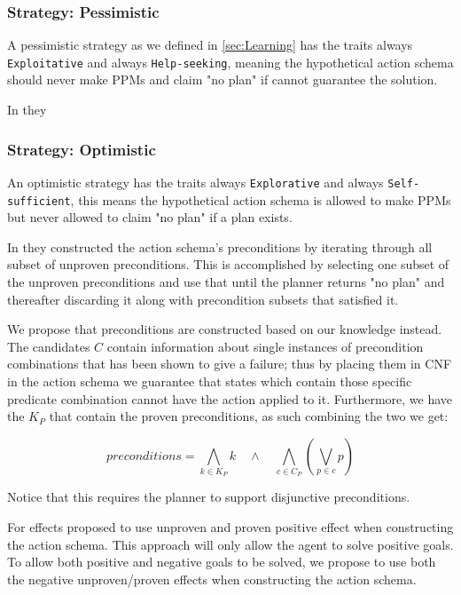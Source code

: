 \documentclass[../Master.tex]{subfiles}
\begin{document}
\subsubsection{Strategy: Pessimistic}

	A pessimistic strategy as we defined in \ref{sec:Learning} has the traits always \texttt{Exploitative} and always \texttt{Help-seeking},
	meaning the hypothetical action schema should never make PPMs and claim "no plan" if cannot guarantee the solution.

	In \cite{Walsh2008} they

\subsubsection{Strategy: Optimistic}

	An optimistic strategy has the traits always \texttt{Explorative} and always \texttt{Self-sufficient},
	this means the hypothetical action schema is allowed to make PPMs but never allowed to claim "no plan" if a plan exists.

	In \cite{Walsh2008} they constructed the action schema's preconditions by iterating through all subset of unproven preconditions.
	This is accomplished by selecting one subset of the unproven preconditions and use that until the planner returns "no plan" and thereafter discarding it along with precondition subsets that satisfied it.

	We propose that preconditions are constructed based on our knowledge instead.
	The candidates $C$ contain information about single instances of precondition combinations that has been shown to give a failure;
	thus by placing them in CNF in the action schema we guarantee that states which contain those specific predicate combination cannot have the action applied to it.
	Furthermore, we have the $K_P$ that contain the proven preconditions, as such combining the two we get:

	\begin{equation}
		preconditions = \bigwedge\limits_{k \in K_P} k \quad \land \quad  \bigwedge \limits_{c \in C_P} \left( \bigvee \limits_{p \in c} p\right)
	\end{equation}

	Notice that this requires the planner to support disjunctive preconditions.

	For effects \cite{Walsh2008} proposed to use unproven and proven positive effect when constructing the action schema. This approach will only allow the agent to solve positive goals.
	To allow both positive and negative goals to be solved, we propose to use both the negative unproven/proven effects when constructing the action schema.
\end{document}
